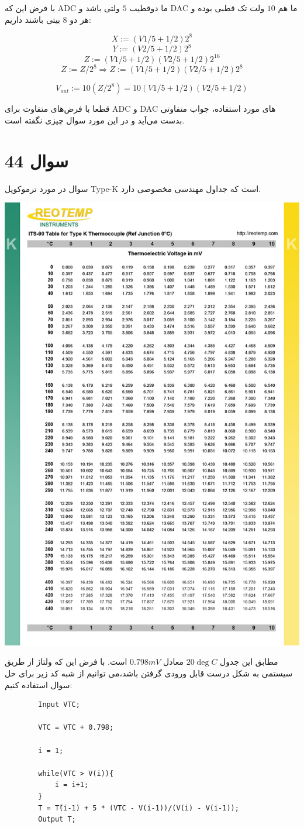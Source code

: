 \documentclass[12pt]{article}
\begin{document}
با فرض این که ADC ما دوقطیب $5$ ولتی باشد و DAC ما هم $10$ ولت تک قطبی بوده و هر دو $8$ بیتی باشند داریم:

$$X:= (V1/5 + 1/2)2^8$$
$$Y:= (V2/5 + 1/2)2^8$$
$$Z:= (V1/5 + 1/2)(V2/5 + 1/2)2^{16}$$
$$Z := Z/2^8 \Rightarrow Z:= (V1/5 + 1/2)(V2/5 + 1/2)2^{8}$$

$$V_{out}:= 10(Z/2^8) = 10(V1/5 + 1/2)(V2/5 + 1/2)$$


قطعا با فرض‌های متفاوت برای ADC و DAC های مورد استفاده، جواب متفاوتی بدست می‌آید و در این مورد سوال چیزی نگفته است.
\newpage
\section*{سوال 44}

سوال در مورد ترموکوپل Type-K است که جداول مهندسی مخصوصی دارد.

\begin{center}
	\includegraphics[width = 0.5 \textwidth]{images/tkc.png}
\end{center}

مطابق این جدول $20\deg C$ معادل $0.798 mV$ است. با فرض این که ولتاژ از طریق سیستمی به شکل درست قابل ورودی گرفتن باشد،‌می توانیم از شبه کد زیر برای حل سوال استفاده کنیم:

\begin{latin}
\begin{Verbatim}
		Input VTC;
		
		VTC = VTC + 0.798;
		
		i = 1;
		
		while(VTC > V(i)){
			i = i+1;
		}
		T = T(ّi-1) + 5 * (VTC - V(i-1))/(V(i) - V(i-1));
		Output T;
\end{Verbatim}
\end{latin}
\end{document}
